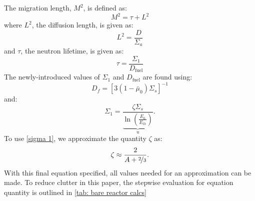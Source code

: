 \documentclass{anstrans}
\begin{document}
    The migration length, $M^2$, is defined as:
    \begin{equation}
        \label{migration length}
        M^2 = \tau + L^2
    \end{equation}
    where $L^2$, the diffusion length, is given as:
    \begin{equation}
        \label{diffusion length}
        L^2 = \frac{D}{\Sigma_a}
    \end{equation}
    and $\tau$, the neutron lifetime, is given as:
    \begin{equation}
        \label{neutron lifetime}
        \tau = \frac{\Sigma_1}{D_{\text{fuel}}}
    \end{equation}
    The newly-introduced values of $\Sigma_1$ and $D_{\text{fuel}}$ are found using:
    \begin{equation}
        \label{special diffusion}
        D_f = \left[ 3\left( 1-\bar{\mu}_0 \right)\Sigma_s \right]^{-1}
    \end{equation}
    and:
    \begin{equation}
        \label{sigma 1}
        \Sigma_1 = \frac{\zeta \Sigma_s}{\underbrace{\ln \left( \frac{E_0}{E_{th}} \right)}_u}.
    \end{equation}
    To use \cref{sigma 1}, we approximate the quantity $\zeta$ as:
    \begin{equation}
        \label{zeta approx}
        \zeta \approx \frac{2}{A+\nicefrac{2}{3}}.
    \end{equation}
    With this final equation specified, all values needed for an approximation can be made.
    To reduce clutter in this paper, the stepwise evaluation for equation quantity is outlined in \cref{tab: bare reactor calcs}
\end{document}

